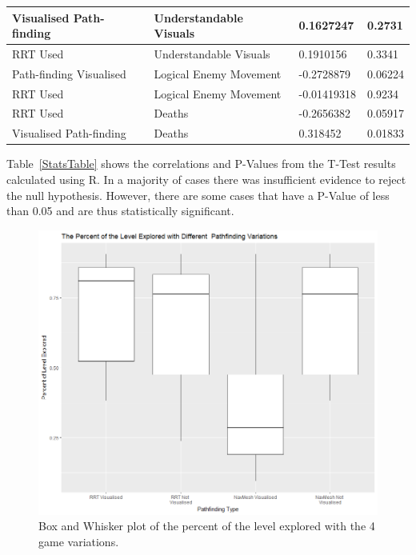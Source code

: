 \documentclass[journal]{IEEEtran}
\begin{document}
\begin{table}[]
\begin{tabular}{|l|l|l|l|}
			Visualised Path-finding & Understandable Visuals & 0.1627247    & 0.2731            \\ \hline
			RRT Used                & Understandable Visuals & 0.1910156    & 0.3341            \\ \hline
			Path-finding Visualised & Logical Enemy Movement & -0.2728879   & 0.06224           \\ \hline
			RRT Used                & Logical Enemy Movement & -0.01419318  & 0.9234            \\ \hline
			RRT Used                & Deaths                 & -0.2656382   & 0.05917           \\ \hline
			\rowcolor{lightgray}Visualised Path-finding & Deaths                 & 0.318452     & 0.01833           \\ \hline
		\end{tabular}
	\end{table}
	
	Table~\ref{StatsTable} shows the correlations and P-Values from the T-Test results calculated using R.  In a majority of cases there was insufficient evidence to reject the null hypothesis. However, there are some cases that have a P-Value of less than 0.05 and are thus statistically significant. 
	
	\begin{figure}[h]
		\includegraphics[width=1.0\linewidth]{GraphPercent.png}
		\caption{Box and Whisker plot of the percent of the level explored with the 4 game variations.}
		\label{graph:Percent}
	\end{figure}
	
\end{document}
